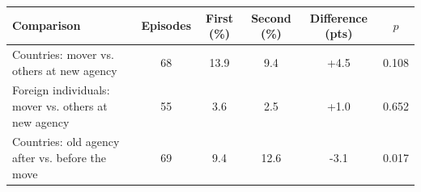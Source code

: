 \begin{tabular}{lccccc}
\toprule
Comparison & Episodes & First (\%) & Second (\%) & Difference (pts) & $p$ \\
\midrule
Countries: mover vs. others at new agency & 68 & 13.9 & 9.4 & +4.5 & 0.108 \\
Foreign individuals: mover vs. others at new agency & 55 & 3.6 & 2.5 & +1.0 & 0.652 \\
Countries: old agency after vs. before the move & 69 & 9.4 & 12.6 & -3.1 & 0.017 \\
\bottomrule
\end{tabular}
